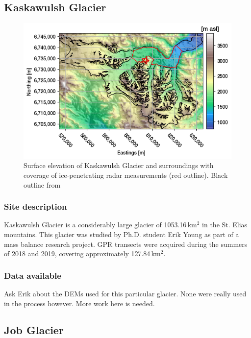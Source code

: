 \documentclass[a4, 12pt]{article}
\begin{document}
\subsection{Kaskawulsh Glacier}
\begin{figure}[h!]
\centering
\includegraphics[scale=0.8]{../imgs/Kaskawulsh glacier/elevation.png}
\caption{Surface elevation \citep{farinotti2019consensus} of Kaskawulsh Glacier and surroundings with coverage of ice-penetrating radar measurements (red outline). Black outline from \citet{pfeffer2014randolph}}
\label{fig:sg_dem}
\end{figure}
\subsubsection{Site description}
Kaskawulsh Glacier is a considerably large glacier of 1053.16\,km$^2$ in the St. Elias mountains. This glacier was studied by Ph.D. student Erik Young as part of a mass balance research project. GPR transects were acquired during the summers of 2018 and 2019, covering approximately 127.84\,km$^2$.
\subsubsection{Data available}
Ask Erik about the DEMs used for this particular glacier. None were really used in the process however. More work here is needed.

\subsection{Job Glacier}
\end{document}
